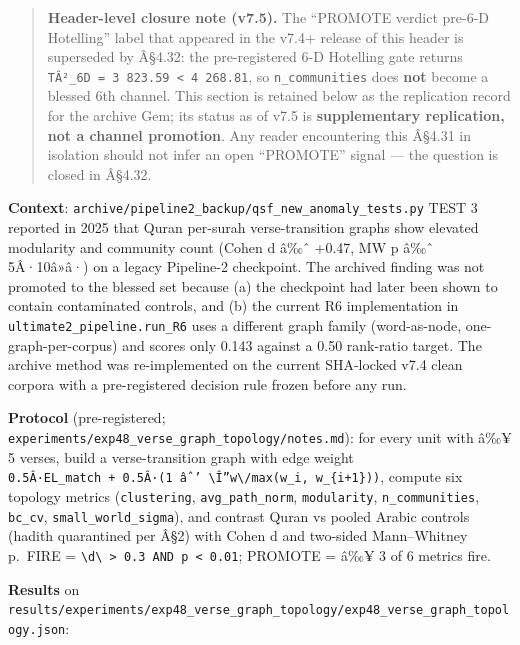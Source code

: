 \documentclass[
]{article}
\begin{document}
\begin{quote}
\textbf{Header-level closure note (v7.5).} The ``PROMOTE verdict pre-6-D
Hotelling'' label that appeared in the v7.4+ release of this header is
superseded by Â§4.32: the pre-registered 6-D Hotelling gate returns
\texttt{TÂ²\_6D\ =\ 3\ 823.59\ \textless{}\ 4\ 268.81}, so
\texttt{n\_communities} does \textbf{not} become a blessed 6th channel.
This section is retained below as the replication record for the archive
Gem; its status as of v7.5 is \textbf{supplementary replication, not a
channel promotion}. Any reader encountering this Â§4.31 in isolation
should not infer an open ``PROMOTE'' signal --- the question is closed
in Â§4.32.
\end{quote}

\textbf{Context}:
\texttt{archive/pipeline2\_backup/qsf\_new\_anomaly\_tests.py} TEST 3
reported in 2025 that Quran per-surah verse-transition graphs show
elevated modularity and community count (Cohen d â‰ˆ +0.47, MW p â‰ˆ
5Â·10â»â·) on a legacy Pipeline-2 checkpoint. The archived finding was
not promoted to the blessed set because (a) the checkpoint had later
been shown to contain contaminated controls, and (b) the current R6
implementation in \texttt{ultimate2\_pipeline.run\_R6} uses a different
graph family (word-as-node, one-graph-per-corpus) and scores only 0.143
against a 0.50 rank-ratio target. The archive method was re-implemented
on the current SHA-locked v7.4 clean corpora with a pre-registered
decision rule frozen before any run.

\textbf{Protocol} (pre-registered;
\texttt{experiments/exp48\_verse\_graph\_topology/notes.md}): for every
unit with â‰¥ 5 verses, build a verse-transition graph with edge weight
\texttt{0.5Â·EL\_match\ +\ 0.5Â·(1\ âˆ’\ \textbackslash{}\textbar{}Î”w\textbackslash{}\textbar{}/max(w\_i,\ w\_\{i+1\}))},
compute six topology metrics (\texttt{clustering},
\texttt{avg\_path\_norm}, \texttt{modularity}, \texttt{n\_communities},
\texttt{bc\_cv}, \texttt{small\_world\_sigma}), and contrast Quran vs
pooled Arabic controls (hadith quarantined per Â§2) with Cohen d and
two-sided Mann--Whitney p.~FIRE =
\texttt{\textbackslash{}\textbar{}d\textbackslash{}\textbar{}\ \textgreater{}\ 0.3\ AND\ p\ \textless{}\ 0.01};
PROMOTE = â‰¥ 3 of 6 metrics fire.

\textbf{Results} on
\texttt{results/experiments/exp48\_verse\_graph\_topology/exp48\_verse\_graph\_topology.json}:
\end{document}
